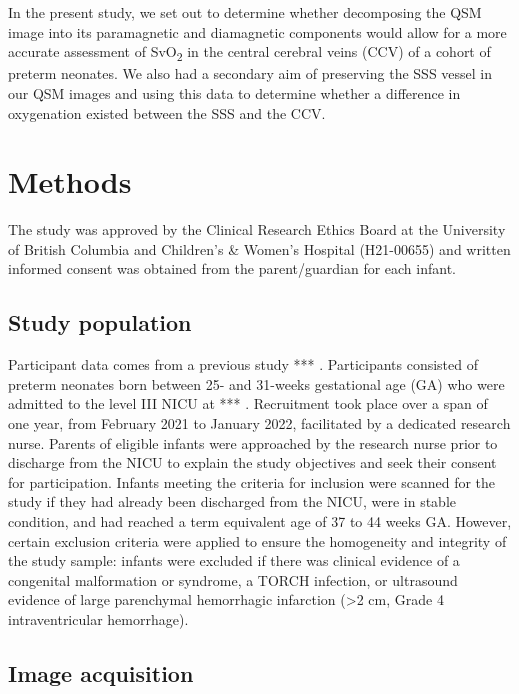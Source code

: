 \documentclass[
true
]{sn-jnl}
\begin{document}
In the present study, we set out to determine whether decomposing the
QSM image into its paramagnetic and diamagnetic components would allow
for a more accurate assessment of SvO\textsubscript{2} in the central
cerebral veins (CCV) of a cohort of preterm neonates. We also had a
secondary aim of preserving the SSS vessel in our QSM images and using
this data to determine whether a difference in oxygenation existed
between the SSS and the CCV.

\section{Methods}\label{sec-data-methods}

The study was approved by the Clinical Research Ethics Board at the
University of British Columbia and Children's \& Women's Hospital
(H21-00655) and written informed consent was obtained from the
parent/guardian for each infant.

\subsection{Study population}\label{study-population}

Participant data comes from a previous study *** . Participants
consisted of preterm neonates born between 25- and 31-weeks gestational
age (GA) who were admitted to the level III NICU at *** . Recruitment
took place over a span of one year, from February 2021 to January 2022,
facilitated by a dedicated research nurse. Parents of eligible infants
were approached by the research nurse prior to discharge from the NICU
to explain the study objectives and seek their consent for
participation. Infants meeting the criteria for inclusion were scanned
for the study if they had already been discharged from the NICU, were in
stable condition, and had reached a term equivalent age of 37 to 44
weeks GA. However, certain exclusion criteria were applied to ensure the
homogeneity and integrity of the study sample: infants were excluded if
there was clinical evidence of a congenital malformation or syndrome, a
TORCH infection, or ultrasound evidence of large parenchymal hemorrhagic
infarction (\textgreater2 cm, Grade 4 intraventricular hemorrhage).

\subsection{Image acquisition}\label{image-acquisition}
\end{document}
